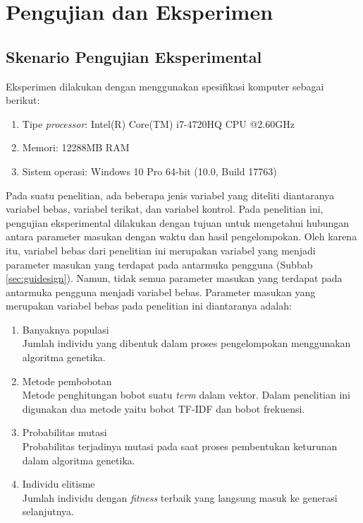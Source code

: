 \chapter{Pengujian dan Eksperimen}
\label{chap:testing}

\section{Skenario Pengujian Eksperimental}
\label{sec:exp-scenario}
Eksperimen dilakukan dengan menggunakan spesifikasi komputer sebagai berikut:

\begin{enumerate}
	\item Tipe \textit{processor}: Intel(R) Core(TM) i7-4720HQ CPU @2.60GHz
	\item Memori: 12288MB RAM
	\item Sistem operasi: Windows 10 Pro 64-bit (10.0, Build 17763)
\end{enumerate}

Pada suatu penelitian, ada beberapa jenis variabel yang diteliti diantaranya variabel bebas, variabel terikat, dan variabel kontrol. Pada penelitian ini, pengujian eksperimental dilakukan dengan tujuan untuk mengetahui hubungan antara parameter masukan dengan waktu dan hasil pengelompokan. Oleh karena itu, variabel bebas dari penelitian ini merupakan variabel yang menjadi parameter masukan yang terdapat pada antarmuka pengguna (Subbab \ref{sec:guidesign}). Namun, tidak semua parameter masukan yang terdapat pada antarmuka pengguna menjadi variabel bebas. Parameter masukan yang merupakan variabel bebas pada penelitian ini diantaranya adalah:

\begin{enumerate}
	\item Banyaknya populasi \\
	Jumlah individu yang dibentuk dalam proses pengelompokan menggunakan algoritma genetika.
	\item Metode pembobotan \\
	Metode penghitungan bobot suatu \textit{term} dalam vektor. Dalam penelitian ini digunakan dua metode yaitu bobot TF-IDF dan bobot frekuensi.
	\item Probabilitas mutasi \\
	Probabilitas terjadinya mutasi pada saat proses pembentukan keturunan dalam algoritma genetika.
	\item Individu elitisme \\
	Jumlah individu dengan \textit{fitness} terbaik yang langsung masuk ke generasi selanjutnya.
\end{enumerate}

